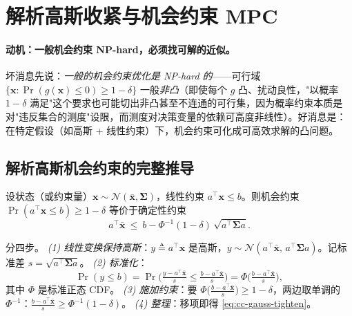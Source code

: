 \section{解析高斯收紧与机会约束 MPC}
\label{sec:cc-gauss}

\paragraph{动机：一般机会约束 NP-hard，必须找可解的近似。}
坏消息先说：\emph{一般的机会约束优化是 NP-hard 的}\cite{nemirovski2006convex,calafiore2006distributionally}——可行域 $\{\mathbf{x}:\Pr(g(\mathbf{x})\le0)\ge1-\delta\}$ 一般\emph{非凸}（即使每个 $g$ 凸、扰动良性，"以概率 $1-\delta$ 满足"这个要求也可能切出非凸甚至不连通的可行集，因为概率约束本质是对"违反集合的测度"设限，而测度对决策变量的依赖可高度非线性）。好消息是：在特定假设（如高斯 + 线性约束）下，机会约束可化成可高效求解的凸问题。

\subsection{解析高斯机会约束的完整推导}
\label{sec:cc-gauss-derive}

\begin{theorem}[解析高斯机会约束的确定性等价]\label{thm:cc-gauss}
设状态（或约束量）$\mathbf{x}\sim\mathcal{N}(\bar{\mathbf{x}},\boldsymbol{\Sigma})$，线性约束 $a^\top\mathbf{x}\le b$。则机会约束 $\Pr(a^\top\mathbf{x}\le b)\ge1-\delta$ 等价于确定性约束
\begin{equation}
  a^\top\bar{\mathbf{x}}\ \le\ b-\Phi^{-1}(1-\delta)\,\sqrt{a^\top\boldsymbol{\Sigma}a}.
  \label{eq:cc-gauss-tighten}
\end{equation}
\end{theorem}

\begin{derivation}
分四步\cite{blackmore2011chance}。
\emph{(1) 线性变换保持高斯}：$y\triangleq a^\top\mathbf{x}$ 是高斯，$y\sim\mathcal{N}(a^\top\bar{\mathbf{x}},\,a^\top\boldsymbol{\Sigma}a)$。记标准差 $s=\sqrt{a^\top\boldsymbol{\Sigma}a}$。
\emph{(2) 标准化}：
\[
  \Pr(y\le b)=\Pr\!\Big(\tfrac{y-a^\top\bar{\mathbf{x}}}{s}\le\tfrac{b-a^\top\bar{\mathbf{x}}}{s}\Big)=\Phi\!\Big(\tfrac{b-a^\top\bar{\mathbf{x}}}{s}\Big),
\]
其中 $\Phi$ 是标准正态 CDF。
\emph{(3) 施加约束}：要 $\Phi\big(\tfrac{b-a^\top\bar{\mathbf{x}}}{s}\big)\ge1-\delta$，两边取单调的 $\Phi^{-1}$：$\tfrac{b-a^\top\bar{\mathbf{x}}}{s}\ge\Phi^{-1}(1-\delta)$。
\emph{(4) 整理}：移项即得 \cref{eq:cc-gauss-tighten}。
\end{derivation}

